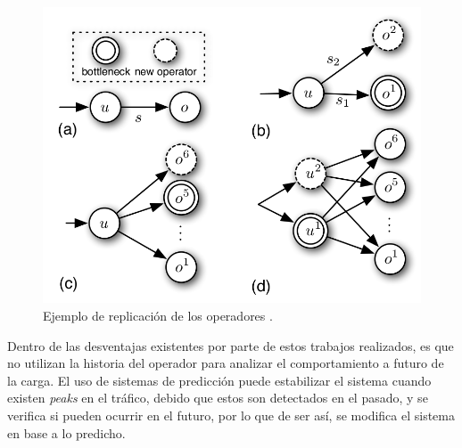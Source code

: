 \begin{figure}[!ht]
	\centering
	\includegraphics[scale=0.3]{images/EjFision.png}
	\caption{Ejemplo de replicación de los operadores \citep{FernandezMKP13}.}
	\label{fig:ejFision}
\end{figure}

Dentro de las desventajas existentes por parte de estos trabajos realizados, es que no utilizan la historia del operador para analizar el comportamiento a futuro de la carga. El uso de sistemas de predicción puede estabilizar el sistema cuando existen \textit{peaks} en el tráfico, debido que estos son detectados en el pasado, y se verifica si pueden ocurrir en el futuro, por lo que de ser así, se modifica el sistema en base a lo predicho.